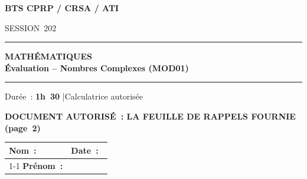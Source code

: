 \documentclass[a4paper,11pt]{article}
\begin{document}

\thispagestyle{fancy}

\begin{center}
  \vspace*{0.2cm}
  {\Huge\bfseries\textcolor{uimm-blue}{BTS CPRP / CRSA / ATI}}

  \vspace{0.25cm}
  {\large SESSION~202\underline{\phantom{00}}}

  \vspace{0.5cm}
  \textcolor{uimm-blue}{\rule{\linewidth}{1.5pt}}
  \vspace{0.15cm}

  {\Huge\bfseries\textcolor{uimm-blue}{MATHÉMATIQUES}}\\[6pt]
  {\Large\bfseries Évaluation -- Nombres Complexes (MOD01)}

  \vspace{0.15cm}
  \textcolor{uimm-blue}{\rule{\linewidth}{1.5pt}}

  \vspace{0.4cm}
  {\large Durée~: \textbf{1h~30} \quad|\quad Calculatrice autorisée}

  \vspace{0.35cm}
  \begin{tcolorbox}[colback=light-gray, colframe=uimm-blue,
      boxrule=1pt, arc=4pt, width=12cm, halign=center]
    {\bfseries DOCUMENT AUTORISÉ~: LA FEUILLE DE RAPPELS FOURNIE (page~2)}
  \end{tcolorbox}
\end{center}

\vspace{0.35cm}

\noindent
\begin{tabularx}{\linewidth}{|X|l|}
\hline
\rowcolor{light-gray}
\textbf{Nom~:} \hspace{5cm} &
  \multirow{2}{*}{\quad\textbf{Date~:}~\hspace{3.5cm}} \\
\cline{1-1}
\rowcolor{light-gray}
\textbf{Prénom~:} \hspace{4.5cm} & \\
\hline
\end{tabularx}

\vspace{0.4cm}
\end{document}
